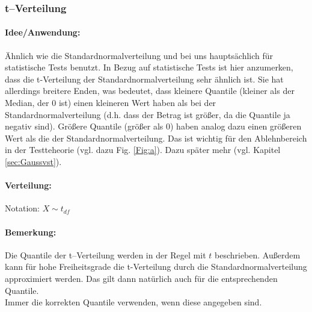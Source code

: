 \documentclass[a4paper]{article}
\newcommand\dangersign[1][2ex]{%
  \renewcommand\stacktype{L}%
  \scaleto{\stackon[1.3pt]{\color{red}$\triangle$}{\tiny !}}{#1}%
}
\begin{document}
\noindent {}


\subsubsection{t--Verteilung} \label{sec:tdistr}

\paragraph{Idee/Anwendung:} Ähnlich wie die Standardnormalverteilung und bei uns hauptsächlich für statistische Tests benutzt. In Bezug auf statistische Tests ist hier anzumerken, dass die t-Verteilung der Standardnormalverteilung sehr ähnlich ist. Sie hat allerdings breitere Enden, was bedeutet, dass kleinere Quantile (kleiner als der Median, der $0$ ist) einen kleineren Wert haben als bei der Standardnormalverteilung (d.h. dass der Betrag ist größer, da die Quantile ja negativ sind). Größere Quantile (größer als $0$) haben analog dazu einen größeren Wert als die der Standardnormalverteilung. Das ist wichtig für den Ablehnbereich in der Testteheorie (vgl. dazu Fig. \ref{Fig:a}). Dazu später mehr (vgl. Kapitel \ref{sec:Gaussvst}).

\paragraph{Verteilung:}Notation: $X \sim t_{df}$

\paragraph{Bemerkung:} Die Quantile der t--Verteilung werden in der Regel mit $t$ beschrieben. Außerdem kann für hohe Freiheitsgrade die t-Verteilung durch die Standardnormalverteilung approximiert werden. Das gilt dann natürlich auch für die entsprechenden Quantile. \\

\noindent \dangersign[3ex] Immer die korrekten Quantile verwenden, wenn diese angegeben sind. \\
\end{document}
